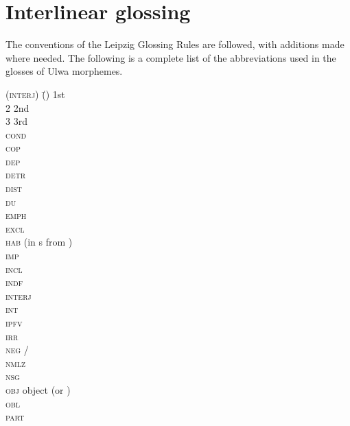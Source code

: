 \addchap{\lsAbbreviationsTitle}

\section*{Interlinear glossing}

The conventions of the Leipzig Glossing Rules \citep{ComrieEtAl2008} are followed, with additions made where needed. The following is a complete list of the abbreviations used in the glosses of Ulwa morphemes.
\begin{tabbing}
{(\textsc{interj})} \=   {()}   \>   1st \\
2   \>   2nd \\
3  \>    3rd \\
\textsc{cond} \>   \\
\textsc{cop} \>   \\
\textsc{dep}  \>  \\
\textsc{detr} \>   \\
\textsc{dist} \>   \\
\textsc{du}   \>   \\
\textsc{emph} \>   \\
\textsc{excl} \>   \\
\textsc{hab} \>     (in s from )\\
\textsc{imp}   \>   \\
\textsc{incl}  \>  \\
\textsc{indf} \>   \\
\textsc{interj} \>   \\
\textsc{int}  \>    \\
\textsc{ipfv} \>   \\
\textsc{irr}   \>   \\
\textsc{neg} \>   /\\
\textsc{nmlz} \>   \\
\textsc{nsg}  \>  \\
\textsc{obj}   \>   object (or )\\
\textsc{obl}  \>  \\
\textsc{part}  \>  \\

\end{tabbing}
